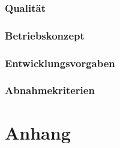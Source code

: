 \documentclass[a4paper,12pt,
headsepline,           %
oneside,               %
pointlessnumbers,      %
bibtotoc,              %
]{scrartcl}
\begin{document}
    \section{Qualität}
    
    \section{Betriebskonzept}
    \section{Entwicklungsvorgaben}
    \section{Abnahmekriterien}

    \part{Anhang}
\end{document}
